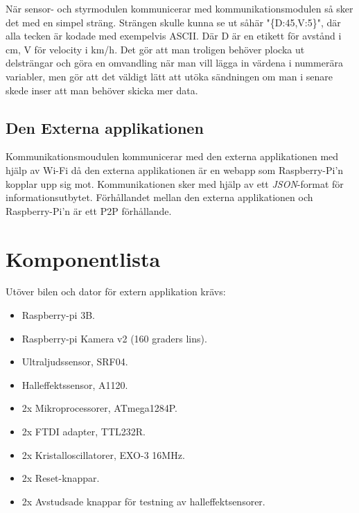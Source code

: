 \documentclass[10pt,oneside,swedish]{lips}
\begin{document}
När sensor- och styrmodulen kommunicerar med kommunikationsmodulen så sker det med en simpel sträng. Strängen skulle kunna se ut såhär "\{D:45,V:5\}", där alla tecken är kodade med exempelvis ASCII. Där D är en etikett för avstånd i cm, V för velocity i km/h.
Det gör att man troligen behöver plocka ut delsträngar och göra en omvandling när man vill lägga in värdena i nummerära variabler, men gör att det väldigt lätt att utöka sändningen om man i senare skede inser att man behöver skicka mer data.

\subsection{Den Externa applikationen}
Kommunikationsmoudulen kommunicerar med den externa applikationen med hjälp av Wi-Fi då den externa applikationen är en webapp som Raspberry-Pi'n kopplar upp sig mot. Kommunikationen sker med hjälp av ett \emph{JSON}-format för informationsutbytet. Förhållandet mellan den externa applikationen och Raspberry-Pi'n är ett P2P förhållande.


\section{Komponentlista}
Utöver bilen och dator för extern applikation krävs:
\begin{itemize}
    \item Raspberry-pi 3B.
    \item Raspberry-pi Kamera v2 (160 graders lins).
    \item Ultraljudssensor, SRF04.
    \item Halleffektssensor, A1120.
    \item 2x Mikroprocessorer, ATmega1284P.
    \item 2x FTDI adapter, TTL232R.
    \item 2x Kristalloscillatorer, EXO-3 16MHz.
    \item 2x Reset-knappar.
    \item 2x Avstudsade knappar för testning av halleffektsensorer.
\end{itemize}

\end{document}

